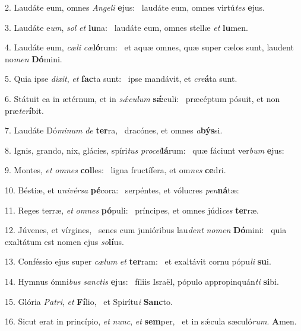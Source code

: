 2. Laudáte eum, omnes \textit{An}\textit{ge}\textit{li} \textbf{e}jus: \ast\  laudáte eum, omnes virtú\textit{tes} \textbf{e}jus.\

3. Laudáte e\textit{um}, \textit{sol} \textit{et} \textbf{lu}na: \ast\  laudáte eum, omnes stellæ \textit{et} \textbf{lu}men.\

4. Laudáte eum, \textit{cæ}\textit{li} \textit{cæ}\textbf{ló}rum: \ast\  et aquæ omnes, quæ super cælos sunt, laudent no\textit{men} \textbf{Dó}mini.\

5. Quia ipse \textit{di}\textit{xit}, \textit{et} \textbf{fac}ta sunt: \ast\  ipse mandávit, et \textit{cre}\textbf{á}ta sunt.\

6. Státuit ea in ætérnum, et in \textit{sǽ}\textit{cu}\textit{lum} \textbf{sǽ}culi: \ast\  præcéptum pósuit, et non præ\textit{ter}\textbf{í}bit.\

7. Laudáte Dó\textit{mi}\textit{num} \textit{de} \textbf{ter}ra, \ast\  dracónes, et omnes \textit{a}\textbf{býs}si.\

8. Ignis, grando, nix, glácies, spíri\textit{tus} \textit{pro}\textit{cel}\textbf{lá}rum: \ast\  quæ fáciunt ver\textit{bum} \textbf{e}jus:\

9. Montes, \textit{et} \textit{om}\textit{nes} \textbf{col}les: \ast\  ligna fructífera, et om\textit{nes} \textbf{ce}dri.\

10. Béstiæ, et u\textit{ni}\textit{vér}\textit{sa} \textbf{pé}cora: \ast\  serpéntes, et vólucres \textit{pen}\textbf{ná}tæ:\

11. Reges terræ, \textit{et} \textit{om}\textit{nes} \textbf{pó}puli: \ast\  príncipes, et omnes júdi\textit{ces} \textbf{ter}ræ.\

12. Júvenes, et vírgines, \dag\  senes cum junióribus lau\textit{dent} \textit{no}\textit{men} \textbf{Dó}mini: \ast\  quia exaltátum est nomen ejus \textit{so}\textbf{lí}us.\

13. Conféssio ejus super \textit{cæ}\textit{lum} \textit{et} \textbf{ter}ram: \ast\  et exaltávit cornu pópu\textit{li} \textbf{su}i.\

14. Hymnus ómni\textit{bus} \textit{sanc}\textit{tis} \textbf{e}jus: \ast\  fíliis Israël, pópulo appropinquán\textit{ti} \textbf{si}bi.\

15. Glória \textit{Pa}\textit{tri}, \textit{et} \textbf{Fí}lio, \ast\  et Spirítu\textit{i} \textbf{Sanc}to.\

16. Sicut erat in princípio, \textit{et} \textit{nunc}, \textit{et} \textbf{sem}per, \ast\  et in sǽcula sæculó\textit{rum}. \textbf{A}men.\

